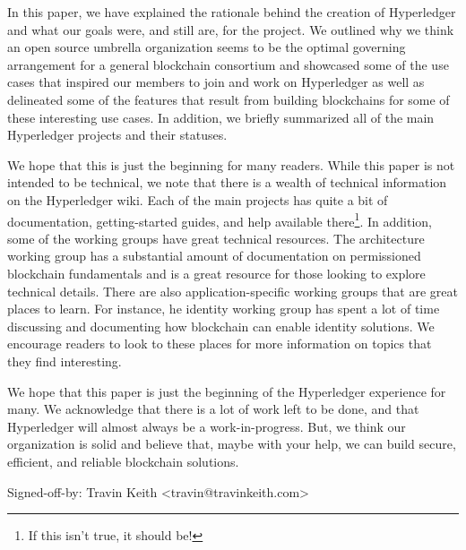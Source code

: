 In this paper, we have explained the rationale behind the creation of Hyperledger and what our goals were, and still are, for the project. We outlined why we think an open source umbrella organization seems to be the optimal governing arrangement for a general blockchain consortium and showcased some of the use cases that inspired our members to join and work on Hyperledger as well as delineated some of the features that result from building blockchains for some of these interesting use cases. In addition, we briefly summarized all of the main Hyperledger projects and their statuses.

We hope that this is just the beginning for many readers. While this paper is not intended to be technical, we note that there is a wealth of technical information on the Hyperledger wiki. Each of the main projects has quite a bit of documentation, getting-started guides, and help available there\footnote{If this isn't true, it should be!}. In addition, some of the working groups have great technical resources. The architecture working group has a substantial amount of documentation on permissioned blockchain fundamentals and is a great resource for those looking to explore technical details. There are also application-specific working groups that are great places to learn. For instance, he identity working group has spent a lot of time discussing and documenting how blockchain can enable identity solutions. We encourage readers to look to these places for more information on topics that they find interesting.

We hope that this paper is just the beginning of the Hyperledger experience for many. We acknowledge that there is a lot of work left to be done, and that Hyperledger will almost always be a work-in-progress. But, we think our organization is solid and believe that, maybe with your help, we can build secure, efficient, and reliable blockchain solutions.

Signed-off-by: Travin Keith <travin@travinkeith.com>
